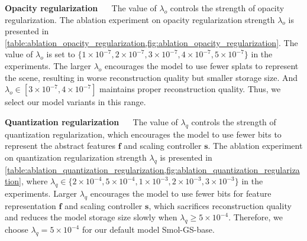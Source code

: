 \documentclass{article}
\def\vf{{\bm{f}}}
\def\vs{{\bm{s}}}
\newcommand{\ours}{Smol-GS\xspace}
\renewcommand{\paragraph}[1]{\noindent\textbf{#1}~~}
\begin{document}
\paragraph{Opacity regularization } 
The value of $\lambda_o$ controls the strength of opacity regularization. The ablation experiment on opacity regularization strength $\lambda_o$ is presented in \cref{table:ablation_opacity_regularization,fig:ablation_opacity_regularization}. The value of $\lambda_o$ is set to $\{1\!\times\! 10^{-7}, 2\!\times\! 10^{-7}, 3\!\times\! 10^{-7}, 4\!\times\! 10^{-7}, 5\!\times\! 10^{-7}\}$ in the experiments. The larger $\lambda_o$ encourages the model to use fewer splats to represent the scene, resulting in worse reconstruction quality but smaller storage size. And $\lambda_o \in [3\!\times\! 10^{-7}, 4\!\times\! 10^{-7}]$ maintains proper reconstruction quality. Thus, we select our model variants in this range.




\paragraph{Quantization regularization } 
The value of $\lambda_q$ controls the strength of quantization regularization, which encourages the model to use fewer bits to represent the abstract features $\vf$ and scaling controller $\vs$. The ablation experiment on quantization regularization strength $\lambda_q$ is presented in \cref{table:ablation_quantization_regularization,fig:ablation_quantization_regularization}, where $\lambda_q \in \{2\!\times \!10^{-4}, 5\!\times \!10^{-4}, 1\!\times \!10^{-3}, 2\!\times \!10^{-3}, 3\!\times \!10^{-3}\}$ in the experiments. Larger $\lambda_q$ encourages the model to use fewer bits for feature representation $\vf$ and scaling controller $\vs$, which sacrifices reconstruction quality and reduces the model storage size slowly when $\lambda_q \geq 5 \!\times\! 10^{-4}$. Therefore, we choose $\lambda_q = 5\!\times \!10^{-4}$ for our default model \ours-base.
\end{document}
